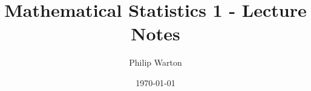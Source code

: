 \documentclass{article}
\begin{document}
\title{Mathematical Statistics 1 - Lecture Notes}
\author{Philip Warton}
\date{\today}
\maketitle
\section{}
\end{document}
